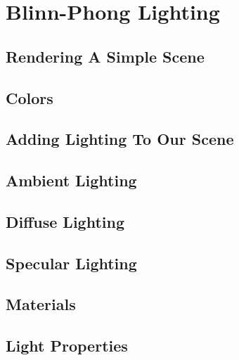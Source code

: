 \chapter{Blinn-Phong Lighting}

\section{Rendering A Simple Scene}

\subsection{}

\section{Colors}

\section{Adding Lighting To Our Scene}

\section{Ambient Lighting}

\section{Diffuse Lighting}

\section{Specular Lighting}

\section{Materials}

\section{Light Properties}
